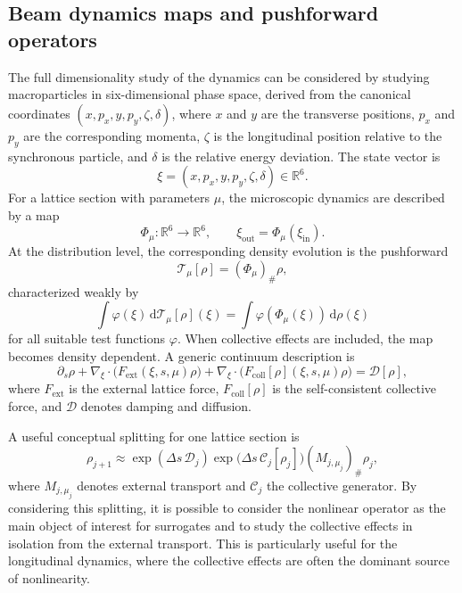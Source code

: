 \documentclass[11pt,a4paper]{article}
\providecommand{\dd}{\,\mathrm{d}}
\begin{document}
\begin{sloppypar}
\subsection{Beam dynamics maps and pushforward operators}
The full dimensionality study of the dynamics can be considered by studying macroparticles in six-dimensional phase space, derived from the canonical coordinates $(x,p_x,y,p_y,\zeta,\delta)$, where $x$ and $y$ are the transverse positions, $p_x$ and $p_y$ are the corresponding momenta, $\zeta$ is the longitudinal position relative to the synchronous particle, and $\delta$ is the relative energy deviation. The state vector is
\begin{equation}
    \xi=(x,p_x,y,p_y,\zeta,\delta)\in\mathbb{R}^{6}.
\end{equation}
For a lattice section with parameters $\mu$, the microscopic dynamics are described by a map
\begin{equation}
    \Phi_\mu:\mathbb{R}^{6}\rightarrow\mathbb{R}^{6},\qquad \xi_{\mathrm{out}}=\Phi_\mu(\xi_{\mathrm{in}}).
    \label{eq:microscopic_map_revised}
\end{equation}
At the distribution level, the corresponding density evolution is the pushforward
\begin{equation}
    \mathcal{T}_{\mu}[\rho]=(\Phi_\mu)_\#\rho,
    \label{eq:pushforward_revised}
\end{equation}
characterized weakly by
\begin{equation}
    \int \varphi(\xi)\dd\mathcal{T}_{\mu}[\rho](\xi)=\int \varphi(\Phi_\mu(\xi))\dd\rho(\xi)
\end{equation}
for all suitable test functions $\varphi$. When collective effects are included, the map becomes density dependent. A generic continuum description is
\begin{equation}
    \partial_s\rho+\nabla_\xi\cdot\big(F_{\mathrm{ext}}(\xi,s,\mu)\rho\big)+\nabla_\xi\cdot\big(F_{\mathrm{coll}}[\rho](\xi,s,\mu)\rho\big)=\mathcal{D}[\rho],
    \label{eq:generic_vfp_6d_revised}
\end{equation}
where $F_{\mathrm{ext}}$ is the external lattice force, $F_{\mathrm{coll}}[\rho]$ is the self-consistent collective force, and $\mathcal{D}$ denotes damping and diffusion.

A useful conceptual splitting for one lattice section is
\begin{equation}
    \rho_{j+1}\approx \exp(\Delta s\,\mathcal{D}_j)\exp\big(\Delta s\,\mathcal{C}_j[\rho_j]\big)(M_{j,\mu_j})_\#\rho_j,
    \label{eq:section_splitting_revised}
\end{equation}
where $M_{j,\mu_j}$ denotes external transport and $\mathcal{C}_j$ the collective generator. By considering this splitting, it is possible to consider the nonlinear operator as the main object of interest for surrogates and to study the collective effects in isolation from the external transport. This is particularly useful for the longitudinal dynamics, where the collective effects are often the dominant source of nonlinearity.


\end{sloppypar}
\end{document}
